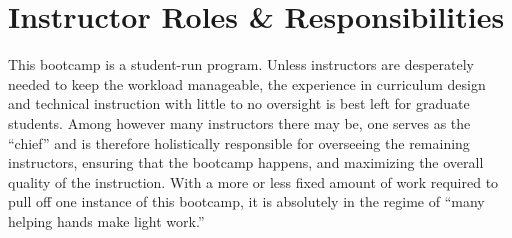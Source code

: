 
\section{Instructor Roles \& Responsibilities}
\label{sec:instructors}
\noindent
This bootcamp is a student-run program.
Unless instructors are desperately needed to keep the workload manageable, the
experience in curriculum design and technical instruction with little to no
oversight is best left for graduate students.
Among however many instructors there may be, one serves as the “chief” and is
therefore holistically responsible for overseeing the remaining instructors,
ensuring that the bootcamp happens, and maximizing the overall quality of the
instruction.
With a more or less fixed amount of work required to pull off one instance of
this bootcamp, it is absolutely in the regime of ``many helping hands make
light work.''

